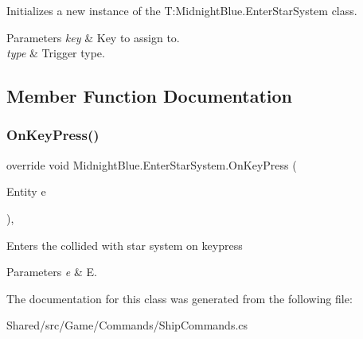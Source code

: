 Initializes a new instance of the T\+:\+Midnight\+Blue.\+Enter\+Star\+System class. 


\begin{DoxyParams}{Parameters}
{\em key} & Key to assign to.\\
\hline
{\em type} & Trigger type.\\
\hline
\end{DoxyParams}


\subsection{Member Function Documentation}
\hypertarget{class_midnight_blue_1_1_enter_star_system_a1cf84a93760ef0cda918915ec8acfa4d}{}\label{class_midnight_blue_1_1_enter_star_system_a1cf84a93760ef0cda918915ec8acfa4d} 
\subsubsection{\texorpdfstring{On\+Key\+Press()}{OnKeyPress()}}
{\footnotesize\ttfamily override void Midnight\+Blue.\+Enter\+Star\+System.\+On\+Key\+Press (\begin{DoxyParamCaption}\item[{Entity}]{e }\end{DoxyParamCaption})\hspace{0.3cm}{\ttfamily [inline]}, {\ttfamily [protected]}}



Enters the collided with star system on keypress 


\begin{DoxyParams}{Parameters}
{\em e} & E.\\
\hline
\end{DoxyParams}


The documentation for this class was generated from the following file\+:\begin{DoxyCompactItemize}
\item 
Shared/src/\+Game/\+Commands/Ship\+Commands.\+cs\end{DoxyCompactItemize}
